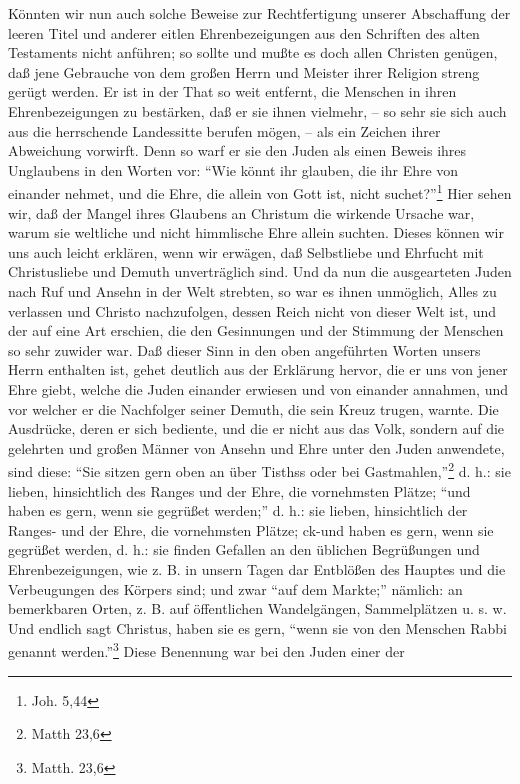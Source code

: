 Könnten wir nun auch solche Beweise zur Rechtfertigung unserer Abschaffung der
leeren Titel und anderer eitlen Ehrenbezeigungen aus den Schriften des alten
Testaments nicht anführen; so sollte und mußte es doch allen Christen genügen,
daß jene Gebrauche von dem großen Herrn und Meister ihrer Religion streng gerügt
werden. Er ist in der That so weit entfernt, die Menschen in ihren
Ehrenbezeigungen zu bestärken, daß er sie ihnen vielmehr, -- so sehr sie sich
auch aus die herrschende Landessitte berufen mögen, -- als ein Zeichen ihrer
Abweichung vorwirft. Denn so warf er sie den Juden als einen Beweis ihres
Unglaubens in den Worten vor: "`Wie könnt ihr glauben, die ihr Ehre von einander
nehmet, und die Ehre, die allein von Gott ist, nicht suchet?"'\footnote{Joh.
5,44} Hier sehen wir, daß der Mangel ihres Glaubens an Christum die wirkende
Ursache war, warum sie weltliche und nicht himmlische Ehre allein suchten.
Dieses können wir uns auch leicht erklären, wenn wir erwägen, daß Selbstliebe
und Ehrfucht mit Christusliebe und Demuth unverträglich sind. Und da nun die
ausgearteten Juden nach Ruf und Ansehn in der Welt strebten, so war es ihnen
unmöglich, Alles zu verlassen und Christo nachzufolgen, dessen Reich nicht von
dieser Welt ist, und der auf eine Art erschien, die den Gesinnungen und der
Stimmung der Menschen so sehr zuwider war. Daß dieser Sinn in den oben
angeführten Worten unsers Herrn enthalten ist, gehet deutlich aus der Erklärung
hervor, die er uns von jener Ehre giebt, welche die Juden einander erwiesen und
von einander annahmen, und vor welcher er die Nachfolger seiner Demuth, die sein
Kreuz trugen, warnte. Die Ausdrücke, deren er sich bediente, und die er nicht
aus das Volk, sondern auf die gelehrten und großen Männer von Ansehn und Ehre
unter den Juden anwendete, sind diese: "`Sie sitzen gern oben an über Tisthss
oder bei Gastmahlen,"'\footnote{Matth 23,6} d. h.: sie lieben, hinsichtlich des
Ranges und der Ehre, die vornehmsten Plätze; "`und haben es gern, wenn sie
gegrüßet werden;"' d. h.: sie lieben, hinsichtlich der Ranges- und der Ehre, die
vornehmsten Plätze; ck-und haben es gern, wenn sie gegrüßet werden, d. h.: sie
finden Gefallen an den üblichen Begrüßungen und Ehrenbezeigungen, wie z. B. in
unsern Tagen dar Entblößen des Hauptes und die Verbeugungen des Körpers sind;
und zwar "`auf dem Markte;"' nämlich: an bemerkbaren Orten, z. B. auf
öffentlichen Wandelgängen, Sammelplätzen u. s. w. Und endlich sagt Christus,
haben sie es gern, "`wenn sie von den Menschen Rabbi genannt
werden."'\footnote{Matth. 23,6} Diese Benennung war bei den Juden einer der
